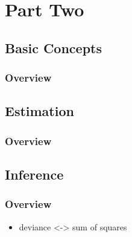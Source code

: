 \documentclass[11pt,fleqn]{book} %
\begin{document}
 \part{Part Two}



\chapter{Basic Concepts}

\section{Overview}




\chapter{Estimation}

\section{Overview}



\chapter{Inference}

\section{Overview}

\begin{itemize}
	\item deviance <-> sum of squares
\end{itemize}
\end{document}
